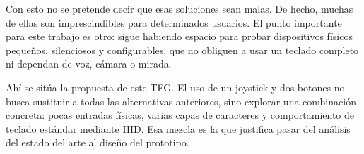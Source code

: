 Con esto no se pretende decir que esas soluciones sean malas. De hecho, muchas de ellas son imprescindibles para determinados usuarios. El punto importante para este trabajo es otro: sigue habiendo espacio para probar dispositivos físicos pequeños, silenciosos y configurables, que no obliguen a usar un teclado completo ni dependan de voz, cámara o mirada.

Ahí se sitúa la propuesta de este TFG. El uso de un joystick y dos botones no busca sustituir a todas las alternativas anteriores, sino explorar una combinación concreta: pocas entradas físicas, varias capas de caracteres y comportamiento de teclado estándar mediante HID. Esa mezcla es la que justifica pasar del análisis del estado del arte al diseño del prototipo.


